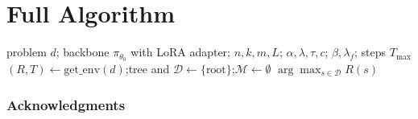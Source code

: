 \documentclass{article} %
\newcommand{\method}{\textsc{Method}}
\newcommand{\dpuct}{\textsc{D-PUCT}}
\newcommand{\Dset}{\mathcal{D}}
\newcommand{\Mem}{\mathcal{M}}
\begin{document}
\section{Full Algorithm}

\begin{algorithm}[h]
\caption{\method: memory-augmented \dpuct{} search with failure-aware max-seeking test-time RL}
\label{alg:main}
\begin{algorithmic}[1]
\Require problem $d$; backbone $\pi_{\theta_0}$ with LoRA adapter; $n, k, m, L$; $\alpha, \lambda, \tau, c$; $\beta, \lambda_f$; steps $T_{\max}$
\State $(R, T) \gets \mathrm{get\_env}(d)$;\quad tree and $\Dset \gets \{\text{root}\}$;\quad $\Mem \gets \emptyset$
\State \Return $\arg\max_{s \in \Dset} R(s)$
\end{algorithmic}
\end{algorithm}











\subsubsection*{Acknowledgments}





\appendix
\end{document}
